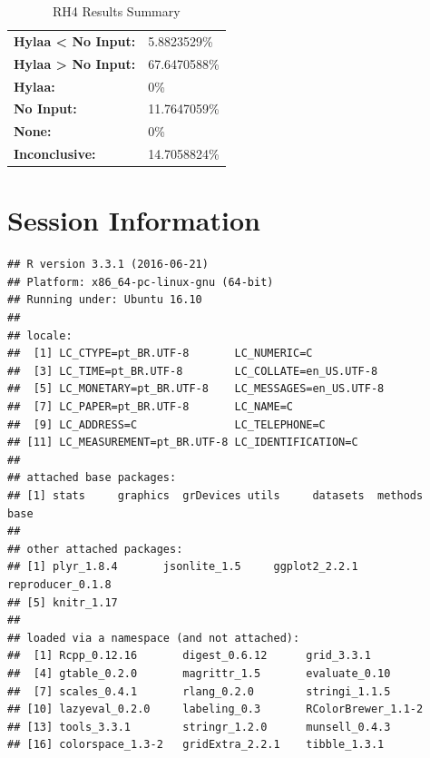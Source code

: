 \documentclass{article}\usepackage[]{graphicx}\usepackage[]{color}
\makeatletter
\newenvironment{kframe}{%
 \def\at@end@of@kframe{}%
 \ifinner\ifhmode%
  \def\at@end@of@kframe{\end{minipage}}%
  \begin{minipage}{\columnwidth}%
 \fi\fi%
 \def\FrameCommand##1{\hskip\@totalleftmargin \hskip-\fboxsep
 \colorbox{shadecolor}{##1}\hskip-\fboxsep
     \hskip-\linewidth \hskip-\@totalleftmargin \hskip\columnwidth}%
 \MakeFramed {\advance\hsize-\width
   \@totalleftmargin\z@ \linewidth\hsize
   \@setminipage}}%
 {\par\unskip\endMakeFramed%
 \at@end@of@kframe}
\newenvironment{knitrout}{}{} %
\makeatother
\begin{document}
	\begin{table}[H]
	\centering
	\caption{RH4 Results Summary}
	\begin{tabular}{ll}
	\textbf{Hylaa \textless{} No Input:}& 5.8823529\% \\
	\textbf{Hylaa \textgreater{} No Input:}& 67.6470588\%\\
	\textbf{Hylaa:} & 0\%\\
	\textbf{No Input:} & 11.7647059\%\\
	\textbf{None:}& 0\%\\
	\textbf{Inconclusive:}& 14.7058824\%
			
	
	\end{tabular}
	\end{table}
	
	
	
		


	
\clearpage
\appendix
\section{Session Information}
\begin{knitrout}
\color{fgcolor}\begin{kframe}
\begin{verbatim}
## R version 3.3.1 (2016-06-21)
## Platform: x86_64-pc-linux-gnu (64-bit)
## Running under: Ubuntu 16.10
## 
## locale:
##  [1] LC_CTYPE=pt_BR.UTF-8       LC_NUMERIC=C              
##  [3] LC_TIME=pt_BR.UTF-8        LC_COLLATE=en_US.UTF-8    
##  [5] LC_MONETARY=pt_BR.UTF-8    LC_MESSAGES=en_US.UTF-8   
##  [7] LC_PAPER=pt_BR.UTF-8       LC_NAME=C                 
##  [9] LC_ADDRESS=C               LC_TELEPHONE=C            
## [11] LC_MEASUREMENT=pt_BR.UTF-8 LC_IDENTIFICATION=C       
## 
## attached base packages:
## [1] stats     graphics  grDevices utils     datasets  methods   base     
## 
## other attached packages:
## [1] plyr_1.8.4       jsonlite_1.5     ggplot2_2.2.1    reproducer_0.1.8
## [5] knitr_1.17      
## 
## loaded via a namespace (and not attached):
##  [1] Rcpp_0.12.16       digest_0.6.12      grid_3.3.1        
##  [4] gtable_0.2.0       magrittr_1.5       evaluate_0.10     
##  [7] scales_0.4.1       rlang_0.2.0        stringi_1.1.5     
## [10] lazyeval_0.2.0     labeling_0.3       RColorBrewer_1.1-2
## [13] tools_3.3.1        stringr_1.2.0      munsell_0.4.3     
## [16] colorspace_1.3-2   gridExtra_2.2.1    tibble_1.3.1
\end{verbatim}
\end{kframe}
\end{knitrout}
\end{document}
